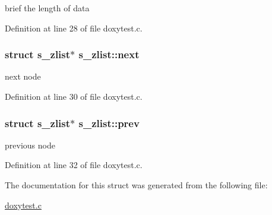 brief the length of data 



Definition at line 28 of file doxytest.\+c.

\hypertarget{structs__zlist_ab48eb89251a032aff475bdee2f0c77e2}{
\subsubsection[{next}]{\setlength{\rightskip}{0pt plus 5cm}struct {\bf s\+\_\+zlist}$\ast$ s\+\_\+zlist\+::next}}\label{structs__zlist_ab48eb89251a032aff475bdee2f0c77e2}


next node 



Definition at line 30 of file doxytest.\+c.

\hypertarget{structs__zlist_a0b063f3a99ed0102cbd29a6271153208}{
\subsubsection[{prev}]{\setlength{\rightskip}{0pt plus 5cm}struct {\bf s\+\_\+zlist}$\ast$ s\+\_\+zlist\+::prev}}\label{structs__zlist_a0b063f3a99ed0102cbd29a6271153208}


previous node 



Definition at line 32 of file doxytest.\+c.



The documentation for this struct was generated from the following file\+:\begin{DoxyCompactItemize}
\item 
\hyperlink{doxytest_8c}{doxytest.\+c}\end{DoxyCompactItemize}
